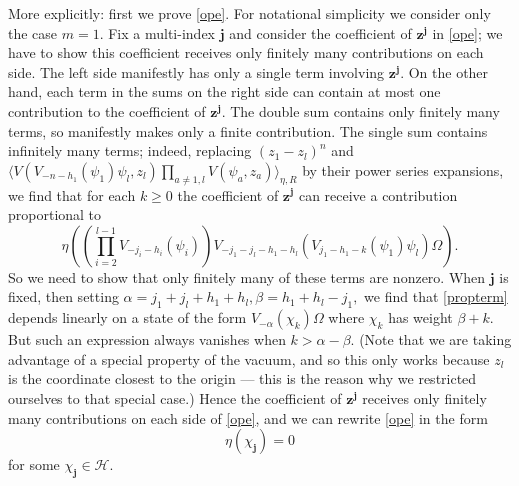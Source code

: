 \documentclass[a4paper,12pt]{article}
\newcommand{\jj}{{\mathbf j}}
\newcommand{\zz}{{\mathbf z}}
\newcommand{\F}{{\mathcal H}}
\newcommand{\IP}[1]{\langle#1\rangle}
\begin{document}
More explicitly:  first we prove \eqref{ope}.  For notational simplicity we consider only the case $m=1$.
Fix a multi-index $\jj$ and consider the coefficient of $\zz^\jj$ in \eqref{ope}; we have to show this
coefficient receives only finitely many contributions on each side.  The left side manifestly has only a single
term involving $\zz^\jj$.  On the other hand, each term in the sums on the right side can contain at
most one contribution to the coefficient of $\zz^\jj$.  The double sum contains only finitely many terms, so manifestly
makes only a finite contribution.  The single sum contains infinitely many terms; indeed,
replacing $(z_1 - z_l)^n$ and $\IP{V(V_{-n-h_1}(\psi_1) \psi_l, z_l) \prod_{a \ne 1,l} V(\psi_a, z_a)}_{\eta,R}$ by their power series expansions,
we find that for each $k \ge 0$ the coefficient of $\zz^\jj$ can receive a contribution proportional to
\begin{equation} \label{propterm}
\eta \left( \left( \prod_{i=2}^{l-1} V_{-j_i-h_i}(\psi_i) \right) V_{- j_1 - j_l - h_1 - h_l}( V_{j_1 - h_1 - k}(\psi_1) \psi_l) \Omega \right).
\end{equation}
So we need to show that only finitely many of these terms are nonzero.
When $\jj$ is fixed, then setting $\alpha = j_1 + j_l + h_1 + h_l, \beta = h_1 + h_l - j_1,$ we find that 
\eqref{propterm} depends linearly on a state of the form $V_{-\alpha}(\chi_k) \Omega$ where
$\chi_k$ has weight $\beta + k$.  But such an expression always vanishes when $k > \alpha-\beta$.
(Note that we are taking advantage of a special property of the vacuum, and so 
this only works because $z_l$ is the coordinate closest to the origin --- this is the 
reason why we restricted ourselves to that special case.)  
Hence the coefficient of $\zz^\jj$ receives only finitely
many contributions on each side of \eqref{ope}, and we can rewrite \eqref{ope} in the form
\begin{equation} \label{ope2}
\eta(\chi_\jj) = 0
\end{equation}
for some $\chi_\jj \in \F$.
\end{document}
